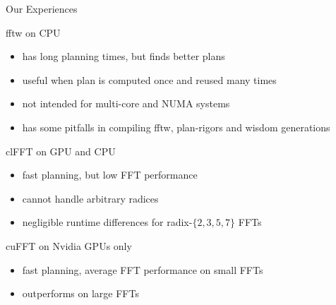 \documentclass[t,11pt,hyperref={
  pdftitle = {gearshifft},
  pdfsubject = {gearshifft},
  pdfborder={0 0 0},
  colorlinks=true,
  urlcolor=red,
  citecolor=red,
  linkcolor=red,
  pdfauthor={Peter Steinbach, Matthias Werner}
  }
]{beamer}
\begin{document}
\appendix
{}

  
  


\begin{frame}{Our Experiences}{}

  fftw on CPU
  \begin{itemize}
  \item has long planning times, but finds better plans
  \item useful when plan is computed once and reused many times
  \item not intended for multi-core and NUMA systems
  \item has some pitfalls in compiling fftw, plan-rigors and wisdom generations
  \end{itemize}

  clFFT on GPU and CPU
  \begin{itemize}
  \item fast planning, but low FFT performance
  \item cannot handle arbitrary radices
  \item negligible runtime differences for radix-$\{2,3,5,7\}$ FFTs
  \end{itemize}

  cuFFT on Nvidia GPUs only
  \begin{itemize}
  \item fast planning, average FFT performance on small FFTs
  \item outperforms on large FFTs
  \end{itemize}
  
\end{frame}
\end{document}
